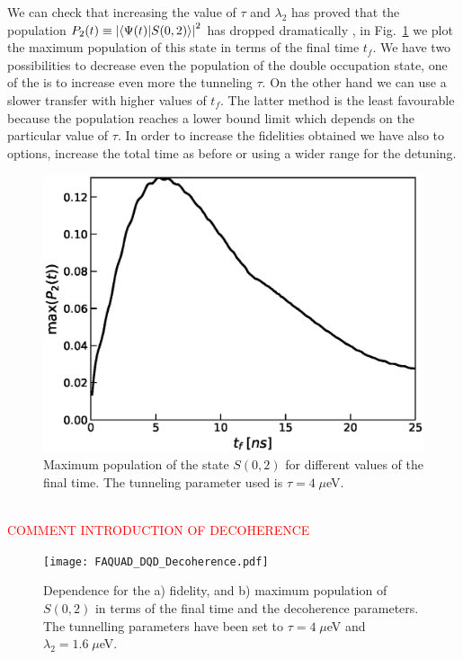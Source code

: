 \documentclass[a4paper,11pt]{article}
\begin{document}
We can check that increasing the value of $\tau$ and $\lambda_2$ has proved that the population $P_2(t)\equiv \abs{\braket{\Psi(t)}{S(0,2)}}^2$ has dropped  dramatically , in Fig.~\ref{fig:max_pop_S22} we plot the maximum population of this state in terms of the final time $t_f$. We have two possibilities to decrease even the population of the double occupation state, one of the is to increase even more the tunneling $\tau$. On the other hand we can use a slower transfer with higher values of $t_f$. The latter method is the least favourable because the population reaches a lower bound limit which depends on the particular value of $\tau$. In order to increase the fidelities obtained we have also to options, increase the total time as before or using a wider range for the detuning.
\begin{figure}[!htbp]
	\centering
	\includegraphics[width=0.7\linewidth]{max_pop_S22.eps}
	\caption{Maximum population of the state $S(0,2)$ for different values of the final time. The tunneling parameter used is $\tau=4\; \mu$eV.}
	\label{fig:max_pop_S22}
\end{figure}\\

\textcolor{red}{COMMENT INTRODUCTION OF DECOHERENCE}
\begin{figure}[!htbp]
	\centering
	\texttt{[image: FAQUAD\_DQD\_Decoherence.pdf]}
	\caption{Dependence for the a) fidelity, and b) maximum population of $S(0,2)$ in terms of the final time and the decoherence parameters. The tunnelling parameters have been set to $\tau=4\; \mu$eV and $\lambda_{2}=1.6\; \mu$eV.}
	\label{fig:FAQUAD_DQD_Decoherence}
\end{figure}
\newpage
\appendix
\end{document}
